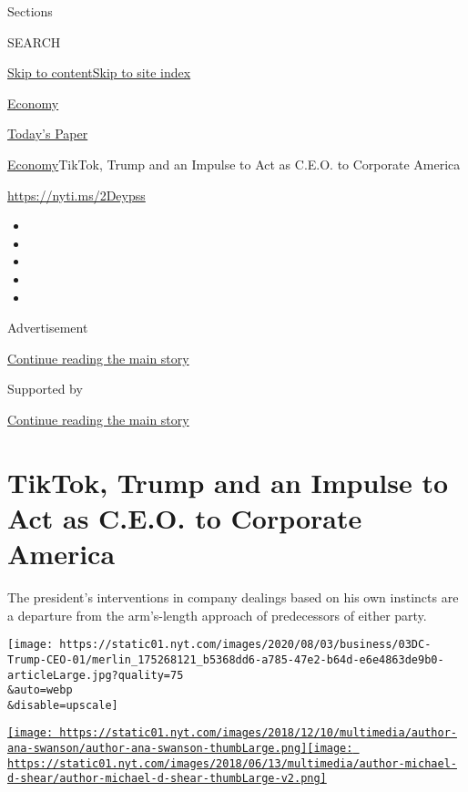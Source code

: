 Sections

SEARCH

\protect\hyperlink{site-content}{Skip to
content}\protect\hyperlink{site-index}{Skip to site index}

\href{https://www.nytimes.com/section/business/economy}{Economy}

\href{https://myaccount.nytimes.com/auth/login?response_type=cookie\&client_id=vi}{}

\href{https://www.nytimes.com/section/todayspaper}{Today's Paper}

\href{/section/business/economy}{Economy}\textbar{}TikTok, Trump and an
Impulse to Act as C.E.O. to Corporate America

\url{https://nyti.ms/2Deypss}

\begin{itemize}
\item
\item
\item
\item
\item
\end{itemize}

Advertisement

\protect\hyperlink{after-top}{Continue reading the main story}

Supported by

\protect\hyperlink{after-sponsor}{Continue reading the main story}

\hypertarget{tiktok-trump-and-an-impulse-to-act-as-ceo-to-corporate-america}{%
\section{TikTok, Trump and an Impulse to Act as C.E.O. to Corporate
America}\label{tiktok-trump-and-an-impulse-to-act-as-ceo-to-corporate-america}}

The president's interventions in company dealings based on his own
instincts are a departure from the arm's-length approach of predecessors
of either party.

\texttt{[image: https://static01.nyt.com/images/2020/08/03/business/03DC-Trump-CEO-01/merlin\_175268121\_b5368dd6-a785-47e2-b64d-e6e4863de9b0-articleLarge.jpg?quality=75\\\&auto=webp\\\&disable=upscale]}

\href{https://www.nytimes.com/by/ana-swanson}{\texttt{[image: https://static01.nyt.com/images/2018/12/10/multimedia/author-ana-swanson/author-ana-swanson-thumbLarge.png]}}\href{https://www.nytimes.com/by/michael-d-shear}{\texttt{[image: https://static01.nyt.com/images/2018/06/13/multimedia/author-michael-d-shear/author-michael-d-shear-thumbLarge-v2.png]}}

